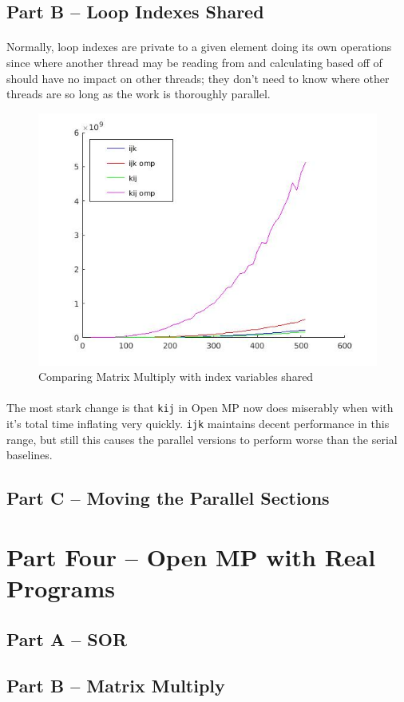 \documentclass[10pt,8.5in,11in]{article}
\begin{document}
	\pagebreak
	\subsection{Part B -- Loop Indexes Shared}
	\paragraph{}
	Normally, loop indexes are private to a given element doing its own operations since where another thread may be reading from and calculating based off of should have no impact on other threads; they don't need to know where other threads are so long as the work is thoroughly parallel.
	
	\begin{figure}[h!]
	\centering
	\caption{Comparing Matrix Multiply with index variables shared}
	\includegraphics[scale=0.5]{part3b}
	\end{figure}
	
	\paragraph{}
	The most stark change is that \texttt{kij} in Open MP now does miserably when with it's total time inflating very quickly.  \texttt{ijk} maintains decent performance in this range, but still this causes the parallel versions to perform worse than the serial baselines.
	
	\subsection{Part C -- Moving the Parallel Sections}
	
	
\section{Part Four -- Open MP with Real Programs}	

	\subsection{Part A -- SOR}
	
	\subsection{Part B -- Matrix Multiply}
	
\end{document}
